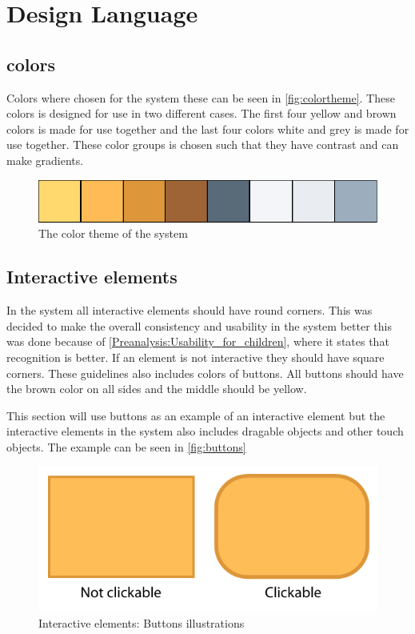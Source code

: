 \section{Design Language}
\label{design:design_language}

\subsection{\giraf[] colors}
\label{design:giraf_colors}

Colors where chosen for the \giraf[] system these can be seen in \autoref{fig:colortheme}. These colors is designed for use in two different cases. The first four yellow and brown colors is made for use together and the last four colors white and grey is made for use together. These color groups is chosen such that they have contrast and can make gradients.

\begin{figure}[h!]
	\centering
	\includegraphics[width=\textwidth]{gfx/design_color_theme}
	\caption{The color theme of the \giraf[] system}
	\label{fig:colortheme}
\end{figure}

\subsection{Interactive elements}
\label{design:button_design}

In the \giraf[] system all interactive elements should have round corners. This was decided to make the overall consistency and usability in the \giraf[] system better this was done because of \autoref{Preanalysis:Usability_for_children}, where it states that recognition is better.
If an element is not interactive they should have square corners.
These guidelines also includes colors of buttons. All buttons should have the brown color on all sides and the middle should be yellow.

This section will use buttons as an example of an interactive element but the interactive elements in the \giraf[] system also includes dragable objects and other touch objects. The example can be seen in \autoref{fig:buttons}

\begin{figure}[h!]
	\centering
	\includegraphics[scale=0.6]{gfx/buttons.pdf}
	\caption{Interactive elements: Buttons illustrations}
	\label{fig:buttons}
\end{figure}